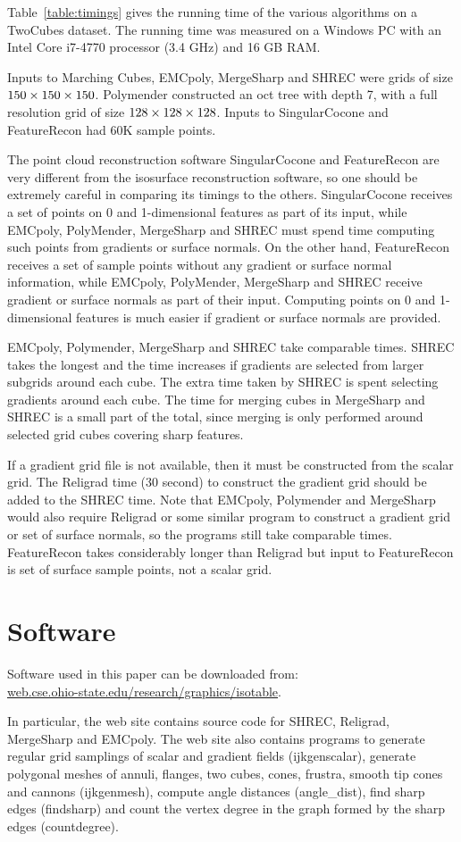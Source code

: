Table~\ref{table:timings} gives the running time
of the various algorithms on a TwoCubes dataset.
The running time was measured on a Windows PC 
with an Intel Core i7-4770 processor (3.4 GHz) and 16 GB RAM.

Inputs to Marching Cubes, EMCpoly, 
MergeSharp and SHREC were grids of size $150 \times 150 \times 150$.  
Polymender constructed an oct tree with depth 7,
with a full resolution grid of size $128 \times 128 \times 128$.
Inputs to SingularCocone and FeatureRecon had 60K sample points.

The point cloud reconstruction software
SingularCocone and FeatureRecon are very different
from the isosurface reconstruction software,
so one should be extremely careful in comparing its timings
to the others.
SingularCocone receives a set of points on 0 and 1-dimensional features
as part of its input,
while EMCpoly, PolyMender, MergeSharp and SHREC must spend
time computing such points from gradients or surface normals.
On the other hand,
FeatureRecon receives a set of sample points 
without any gradient or surface normal information,
while EMCpoly, PolyMender, MergeSharp and SHREC receive
gradient or surface normals as part of their input.
Computing points on 0 and 1-dimensional features
is much easier if gradient or surface normals are provided.

EMCpoly, Polymender, MergeSharp and SHREC take comparable times.
SHREC takes the longest and the time increases 
if gradients are selected from larger subgrids around each cube.
The extra time taken by SHREC is spent selecting gradients
around each cube.
The time for merging cubes in MergeSharp and SHREC is
a small part of the total, since merging is only performed
around selected grid cubes covering sharp features.

If a gradient grid file is not available,
then it must be constructed from the scalar grid.
The Religrad time (30 second) to construct the gradient grid
should be added to the SHREC time.
Note that EMCpoly, Polymender and MergeSharp would also require
Religrad or some similar program to construct a gradient grid
or set of surface normals,
so the programs still take comparable times.
FeatureRecon takes considerably longer than Religrad
but input to FeatureRecon is  set of surface sample points,
not a scalar grid.


\section{Software}

Software used in this paper can be downloaded from:\\
\href{http://web.cse.ohio-state.edu/research/graphics/isotable}{web.cse.ohio-state.edu/research/graphics/isotable}.

In particular, the web site contains source code
for SHREC, Religrad, MergeSharp and EMCpoly.
The web site also contains programs 
to generate regular grid samplings of scalar and gradient fields
(ijkgenscalar),
generate polygonal meshes of annuli, flanges, two cubes,
cones, frustra, smooth tip cones and cannons (ijkgenmesh),
compute angle distances (angle\_dist),
find sharp edges (findsharp) 
and count the vertex degree in the graph formed by the sharp edges
(countdegree).
